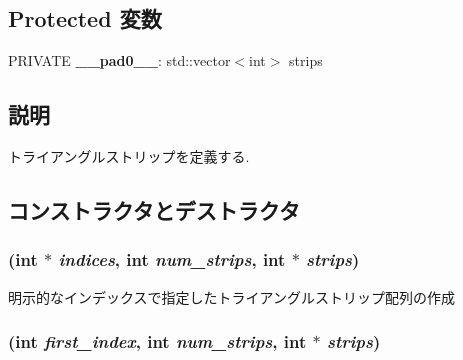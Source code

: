 \subsection*{Protected 変数}
\begin{CompactItemize}
\item 
\hypertarget{classm3g_1_1TriangleStripArray_09d77e6556195583218cf7f0bc11ab1c}{
PRIVATE \textbf{\_\-\_\-pad0\_\-\_\-}: std::vector$<$int$>$ strips}
\label{classm3g_1_1TriangleStripArray_09d77e6556195583218cf7f0bc11ab1c}

\end{CompactItemize}


\subsection{説明}
トライアングルストリップを定義する. 

\subsection{コンストラクタとデストラクタ}
\hypertarget{classm3g_1_1TriangleStripArray_57d4e874819367084aeadb11593c4436}{
\subsubsection[{TriangleStripArray}]{ (int $\ast$ {\em indices}, \/  int {\em num\_\-strips}, \/  int $\ast$ {\em strips})}}
\label{classm3g_1_1TriangleStripArray_57d4e874819367084aeadb11593c4436}


明示的なインデックスで指定したトライアングルストリップ配列の作成 \hypertarget{classm3g_1_1TriangleStripArray_d2ca9884a6ccf32da3cee977549b5ee0}{
\subsubsection[{TriangleStripArray}]{ (int {\em first\_\-index}, \/  int {\em num\_\-strips}, \/  int $\ast$ {\em strips})}}
\label{classm3g_1_1TriangleStripArray_d2ca9884a6ccf32da3cee977549b5ee0}



